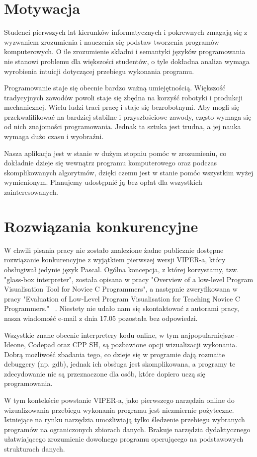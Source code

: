 \documentclass[a4paper,twoside,openright,11pt]{report}
\begin{document}
  \section{Motywacja}
\par Studenci pierwszych lat kierunków informatycznych i pokrewnych zmagają się z wyzwaniem zrozumienia i nauczenia się podstaw tworzenia programów komputerowych. O ile zrozumienie składni i semantyki języków programowania nie stanowi problemu dla większości studentów, o tyle dokładna analiza wymaga wyrobienia intuicji dotyczącej przebiegu wykonania programu.
\par Programowanie staje się obecnie bardzo ważną umiejętnością. Większość tradycyjnych zawodów powoli staje się zbędna na korzyść robotyki i produkcji mechanicznej. Wielu ludzi traci pracę i staje się bezrobotnymi. Aby mogli się przekwalifikować na bardziej stabilne i przyszłościowe zawody, często wymaga się od nich znajomości programowania. Jednak ta sztuka jest trudna, a jej nauka wymaga dużo czasu i wyobraźni. 
\par Nasza aplikacja jest w stanie w dużym stopniu pomóc w zrozumieniu, co dokładnie dzieje się wewnątrz programu komputerowego oraz podczas skomplikowanych algorytmów, dzięki czemu jest w stanie pomóc wszystkim wyżej wymienionym. Planujemy udostępnić ją bez opłat dla wszystkich zainteresowanych.

  \section{Rozwiązania konkurencyjne}
\par W chwili pisania pracy nie zostało znalezione żadne publicznie dostępne rozwiązanie konkurencyjne z wyjątkiem pierwszej wersji VIPER-a, który obsługiwał jedynie język Pascal. Ogólna koncepcja, z której korzystamy, tzw. "glass-box interpreter", została opisana w pracy "Overview of a low-level Program Visualisation Tool for Novice C Programmers"\cite{overview-vistool}, a następnie zweryfikowana w pracy "Evaluation of Low-Level Program Visualisation for Teaching Novice C Programmers." ~\cite{evaluation-vistool}. Niestety nie udało nam się skontaktować z autorami pracy, nasza wiadomość e-mail z dnia 17.05 pozostała bez odpowiedzi.
\par Wszystkie znane obecnie interpretery kodu online, w tym najpopularniejsze - Ideone, Codepad oraz CPP SH, są pozbawione opcji wizualizacji wykonania. Dobrą możliwość zbadania tego, co dzieje się w programie dają rozmaite debuggery (np. gdb), jednak ich obsługa jest skomplikowana, a programy te zdecydowanie nie są przeznaczone dla osób, które dopiero uczą się programowania.
\par W tym kontekście powstanie VIPER-a, jako pierwszego narzędzia online do wizualizowania przebiegu wykonania programu jest niezmiernie pożyteczne. Istniejące na rynku narzędzia umożliwiają tylko śledzenie przebiegu wybranych programów na ograniczonych zbiorach danych. Brakuje narzędzia dydaktycznego ułatwiającego zrozumienie dowolnego programu operującego na podstawowych strukturach danych. 
\end{document}
